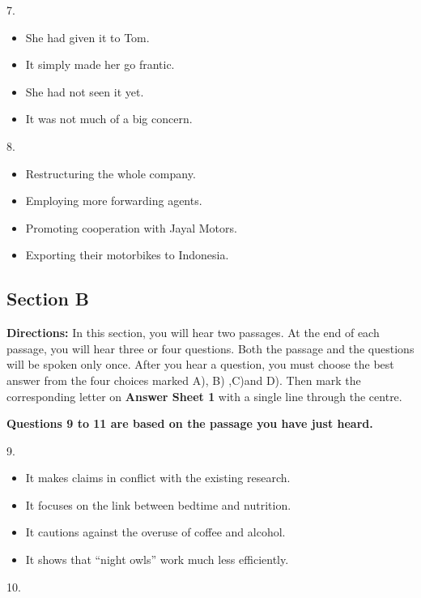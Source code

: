 \documentclass[UTF8,11pt]{ctexart}
\begin{document}
7.


\begin{itemize}[leftmargin=2em,itemsep=.2em,topsep=.4em]\item[A.] She had given it to Tom.
\item[B.] It simply made her go frantic.
\item[C.] She had not seen it yet.
\item[D.] It was not much of a big concern.
\end{itemize}

8.


\begin{itemize}[leftmargin=2em,itemsep=.2em,topsep=.4em]\item[A.] Restructuring the whole company.
\item[B.] Employing more forwarding agents.
\item[C.] Promoting cooperation with Jayal Motors.
\item[D.] Exporting their motorbikes to Indonesia.
\end{itemize}

\subsection*{\textbf{Section B}}


\textbf{Directions:} In this section, you will hear two passages. At the end of each passage, you will hear three or four questions. Both the passage and the questions will be spoken only once. After you hear a question, you must choose the best answer from the four choices marked A), B) ,C)and D). Then mark the corresponding letter on\textbf{ Answer Sheet 1} with a single line through the centre.


\textbf{Questions 9 to 11 are based on the passage you have just heard.}


9.


\begin{itemize}[leftmargin=2em,itemsep=.2em,topsep=.4em]\item[A.] It makes claims in conflict with the existing research.
\item[B.] It focuses on the link between bedtime and nutrition.
\item[C.] It cautions against the overuse of coffee and alcohol.
\item[D.] It shows that “night owls” work much less efficiently.
\end{itemize}

10.
\end{document}
